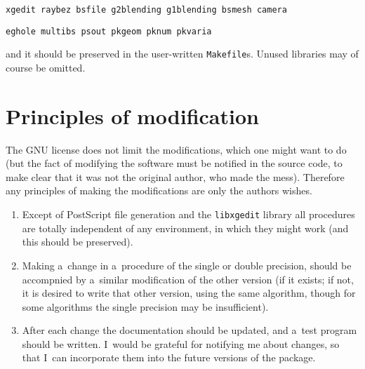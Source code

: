 \vspace{\medskipamount}
\centerline{\texttt{xgedit raybez bsfile g2blending g1blending bsmesh camera}}

\centerline{\texttt{eghole multibs psout pkgeom pknum pkvaria}}
\vspace{\medskipamount}

\noindent
and it should be preserved in the user-written \texttt{Makefile}s.
Unused libraries may of course be omitted.


\section{Principles of modification}

The GNU license does not limit the modifications, which one might want to do
(but the fact of modifying the software must be notified in the source code,
to make clear that it was not the original author, who made the mess).
Therefore any principles of making the modifications are only
the authors wishes.
\begin{enumerate}
\item Except of PostScript file generation and the \texttt{libxgedit}
  library all procedures are totally independent of any environment, in
  which they might work (and this should be preserved).
\item Making a~change in a~procedure of the single or double precision,
  should be accompnied by a~similar modification of the other version
  (if it exists; if not, it is desired to write that other version,
  using the same algorithm, though for some algorithms the single precision may
  be insufficient).
\item After each change the documentation should be updated, and a~test
  program should be written. I~would be grateful for notifying me
  about changes, so that I~can incorporate them into the future versions
  of the package.
\end{enumerate}


